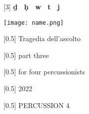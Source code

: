 \documentclass[11pt]{report}
\begin{document}
\begin{titlepage}
        \vspace*{6\baselineskip}
\begin{center}
      {
      	\scalebox{3}[3]
            {\fontsize{0.6cm}{1em}\selectfont  \textbf{ḏ \ ḥ \ w \ t \ j} }
        }
\end{center}
\begin{center}
\texttt{[image: name.png]}
\end{center}
        \vspace*{2\baselineskip}
\begin{center}
        {
            \scalebox{0.5}[0.5]
            {\fontsize{1.5cm}{1em}\selectfont \setmainfont{Bell MT}Tragedia dell'ascolto}
        }
\end{center}
        \vspace*{-2\baselineskip}
\begin{center}
        {
            \scalebox{0.5}[0.5]
            {\fontsize{1.2cm}{1em}\selectfont \setmainfont{Bell MT}part three}
        }
\end{center}
        \vspace*{-2\baselineskip}
\begin{center}
        {
            \scalebox{0.5}[0.5]
            {\fontsize{1.2cm}{1em}\selectfont \setmainfont{Bell MT}for four percussionists}
        }
\end{center}
        \vspace*{1.5\baselineskip}
\begin{center}
        {
            \scalebox{0.5}[0.5]
            {\fontsize{1.2cm}{1em}\selectfont \setmainfont{Bell MT}2022}
        }
\end{center}
        \vspace*{10\baselineskip}
\begin{center}
        {
            \scalebox{0.5}[0.5]
            {\fontsize{1.2cm}{1em}\selectfont \setmainfont{Bell MT}PERCUSSION 4}
        }
\end{center}

    \end{titlepage}
\end{document}
